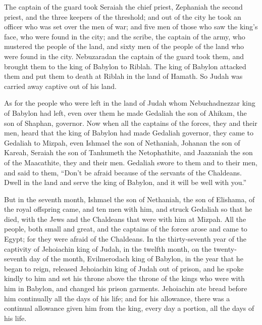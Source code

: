  The captain of the guard took Seraiah the chief priest,
Zephaniah the second priest, and the three keepers of the threshold;
 and out of the city he took an officer who was set over
the men of war; and five men of those who saw the king's face, who were
found in the city; and the scribe, the captain of the army, who mustered
the people of the land, and sixty men of the people of the land who were
found in the city.  Nebuzaradan the captain of the guard
took them, and brought them to the king of Babylon to Riblah.
 The king of Babylon attacked them and put them to death at
Riblah in the land of Hamath. So Judah was carried away captive out of
his land.

 As for the people who were left in the land of Judah whom
Nebuchadnezzar king of Babylon had left, even over them he made Gedaliah
the son of Ahikam, the son of Shaphan, governor.  Now when
all the captains of the forces, they and their men, heard that the king
of Babylon had made Gedaliah governor, they came to Gedaliah to Mizpah,
even Ishmael the son of Nethaniah, Johanan the son of Kareah, Seraiah
the son of Tanhumeth the Netophathite, and Jaazaniah the son of the
Maacathite, they and their men.  Gedaliah swore to them and
to their men, and said to them, ``Don't be afraid because of the
servants of the Chaldeans. Dwell in the land and serve the king of
Babylon, and it will be well with you.''

 But in the seventh month, Ishmael the son of Nethaniah,
the son of Elishama, of the royal offspring came, and ten men with him,
and struck Gedaliah so that he died, with the Jews and the Chaldeans
that were with him at Mizpah.  All the people, both small
and great, and the captains of the forces arose and came to Egypt; for
they were afraid of the Chaldeans.  In the thirty-seventh
year of the captivity of Jehoiachin king of Judah, in the twelfth month,
on the twenty-seventh day of the month, Evilmerodach king of Babylon, in
the year that he began to reign, released Jehoiachin king of Judah out
of prison,  and he spoke kindly to him and set his throne
above the throne of the kings who were with him in Babylon,
 and changed his prison garments. Jehoiachin ate bread
before him continually all the days of his life;  and for
his allowance, there was a continual allowance given him from the king,
every day a portion, all the days of his life.

